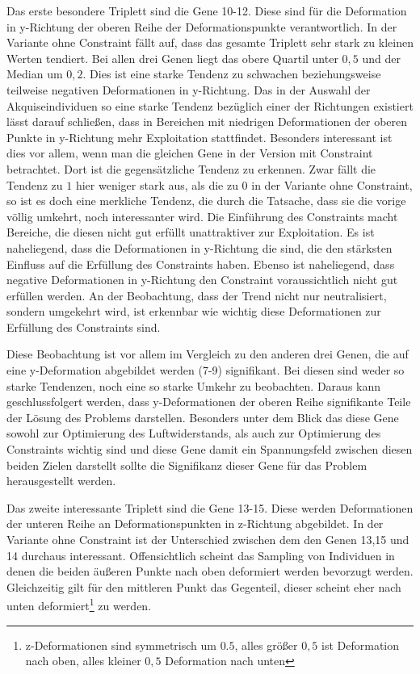 Das erste besondere Triplett sind die Gene 10-12.
Diese sind für die Deformation in y-Richtung der oberen Reihe der Deformationspunkte verantwortlich.
In der Variante ohne Constraint fällt auf, dass das gesamte Triplett sehr stark zu kleinen Werten tendiert. 
Bei allen drei Genen liegt das obere Quartil unter $0,5$ und der Median um $0,2$.
Dies ist eine starke Tendenz zu schwachen beziehungsweise teilweise negativen Deformationen in y-Richtung.
Das in der Auswahl der Akquiseindividuen so eine starke Tendenz bezüglich einer der Richtungen existiert lässt darauf schließen, dass in Bereichen mit niedrigen Deformationen der oberen Punkte in y-Richtung mehr Exploitation stattfindet.
Besonders interessant ist dies vor allem, wenn man die gleichen Gene in der Version mit Constraint betrachtet.
Dort ist die gegensätzliche Tendenz zu erkennen.
Zwar fällt die Tendenz zu $1$ hier weniger stark aus, als die zu $0$ in der Variante ohne Constraint, so ist es doch eine merkliche Tendenz, die durch die Tatsache, dass sie die vorige völlig umkehrt, noch interessanter wird.
Die Einführung des Constraints macht Bereiche, die diesen nicht gut erfüllt unattraktiver zur Exploitation.
Es ist naheliegend, dass die Deformationen in y-Richtung die sind, die den stärksten Einfluss auf die Erfüllung des Constraints haben.
Ebenso ist naheliegend, dass negative Deformationen in y-Richtung den Constraint voraussichtlich nicht gut erfüllen werden.
An der Beobachtung, dass der Trend nicht nur neutralisiert, sondern umgekehrt wird, ist erkennbar wie wichtig diese Deformationen zur Erfüllung des Constraints sind.

Diese Beobachtung ist vor allem im Vergleich zu den anderen drei Genen, die auf eine y-Deformation abgebildet werden (7-9) signifikant.
Bei diesen sind weder so starke Tendenzen, noch eine so starke Umkehr zu beobachten.
Daraus kann geschlussfolgert werden, dass y-Deformationen der oberen Reihe signifikante Teile der Lösung des Problems darstellen.
Besonders unter dem Blick das diese Gene sowohl zur Optimierung des Luftwiderstands, als auch zur Optimierung des Constraints wichtig sind und diese Gene damit ein Spannungsfeld zwischen diesen beiden Zielen darstellt sollte die Signifikanz dieser Gene für das Problem herausgestellt werden.

Das zweite interessante Triplett sind die Gene 13-15.
Diese werden Deformationen der unteren Reihe an Deformationspunkten in z-Richtung abgebildet.
In der Variante ohne Constraint ist der Unterschied zwischen dem den Genen 13,15 und 14 durchaus interessant.
Offensichtlich scheint das Sampling von Individuen in denen die beiden äußeren Punkte nach oben deformiert werden bevorzugt werden.
Gleichzeitig gilt für den mittleren Punkt das Gegenteil, dieser scheint eher nach unten deformiert\footnote{z-Deformationen sind symmetrisch um $0.5$, alles größer $0,5$ ist Deformation nach oben, alles kleiner $0,5$ Deformation nach unten} zu werden.


